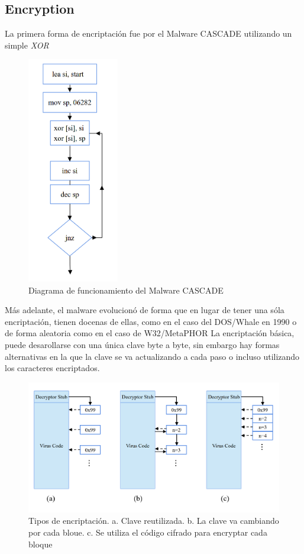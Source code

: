\documentclass[15pt]{article}
\begin{document}
	\subsection{Encryption}
	La primera forma de encriptación fue por el Malware CASCADE utilizando un simple \textit{XOR} \cite{cascade}
	\begin{figure}[H]
		\centering
		\includegraphics[width=4cm]{images/cascade.png}
		\caption{Diagrama de funcionamiento del Malware CASCADE}
	\end{figure}
	Más adelante, el malware evolucionó de forma que en lugar de tener una sóla encriptación, tienen docenas de ellas, como en el caso del DOS/Whale en 1990 \cite{whale} o de forma aleatoria como en el caso de W32/MetaPHOR \cite{metaphor}
	La encriptación básica, puede desarollarse con una única clave byte a byte, sin embargo hay formas alternativas en la que la clave se va actualizando a cada paso o incluso utilizando los caracteres encriptados.
	
	\begin{figure}[H]
		\centering
		\includegraphics[width=12cm]{images/encrypt.png}
		\caption{Tipos de encriptación. a. Clave reutilizada. b. La clave va cambiando por cada bloue. c. Se utiliza el código cifrado para encryptar cada bloque}
	\end{figure}
\end{document}
